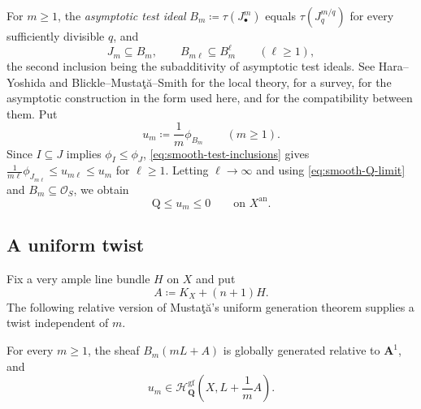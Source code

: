 \documentclass[11pt,a4paper]{article}
\newcommand{\an}{\mathrm{an}}          %
\begin{document}
For $m\geq1$, the \emph{asymptotic test ideal} $B_m\coloneqq\tau(J_\bullet^m)$ equals $\tau(J_q^{m/q})$ for every sufficiently divisible $q$, and
\begin{equation}\label{eq:smooth-test-inclusions}
                  J_m\subseteq B_m,
 \qquad
                  B_{m\ell}\subseteq B_m^\ell\qquad(\ell\ge1),
\end{equation}
the second inclusion being the subadditivity of asymptotic test ideals. See Hara--Yoshida \cite{HaraYoshida} and Blickle--Musta\c{t}\u{a}--Smith \cite{BMS08} for the local theory, \cite{SchwedeTucker} for a survey, \cite[\S3, Proposition~3.1]{MustataTest} for the asymptotic construction in the form used here, and \cite[\S4]{GJKM19} for the compatibility between them. Put
\[
 u_m\coloneqq\frac1m\phi_{B_m}\qquad(m\ge1).
\]
Since $I\subseteq J$ implies $\phi_I\leq\phi_J$, \eqref{eq:smooth-test-inclusions} gives $\frac1{m\ell}\phi_{J_{m\ell}}\le u_{m\ell}\le u_m$ for $\ell\ge1$. Letting $\ell\to\infty$ and using \eqref{eq:smooth-Q-limit} and $B_m\subseteq\mathcal O_S$, we obtain
\begin{equation}\label{eq:smooth-Q-test-sandwich}
                         \mathrm{Q}\leq u_m\leq0
                         \qquad\text{on }X^{\an}.
\end{equation}

\subsection*{A uniform twist}

Fix a very ample line bundle $H$ on $X$ and put
\[
 A\coloneqq K_X+(n+1)H.
\]
The following relative version of Musta\c{t}\u{a}'s uniform generation theorem \cite[Theorem~A]{MustataTest} supplies a twist independent of $m$.

\begin{lemma}\label{lem:smooth-uniform-twist}
For every $m\geq1$, the sheaf $B_m(mL+A)$ is globally generated relative to $\mathbf A^1$, and
\begin{equation}\label{eq:smooth-FS-class}
 u_m\in\mathcal{H}^{\mathrm{gf}}_{\mathbf{Q}}\left(X,L+\frac1mA\right).
\end{equation}
\end{lemma}
\end{document}

